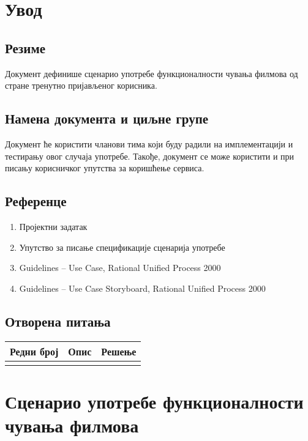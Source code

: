 \section{Увод}

\subsection{Резиме}

Документ дефинише сценарио употребе функционалности чувања филмова од стране тренутно пријављеног
корисника.

\subsection{Намена документа и циљне групе}

Документ ће користити чланови тима који буду радили на имплементацији и тестирању овог случаја
употребе. Такође, документ се може користити и при писању корисничког упутства за коришћење
сервиса.

\subsection{Референце}

\begin{enumerate}
    \item Пројектни задатак
    \item Упутство за писање спецификације сценарија употребе
    \item Guidelines – Use Case, Rational Unified Process 2000
    \item Guidelines – Use Case Storyboard, Rational Unified Process 2000
\end{enumerate}

\subsection{Отворена питања}

\noindent
\setcellgapes{4pt}
\makegapedcells
\begin{tabularx}{\linewidth}{|l|X|X|}
    \hline
    \textbf{Редни број} & \textbf{Опис} & \textbf{Решење} \\
    \hline
    & & \\
    \hline
\end{tabularx}

\section{Сценарио употребе функционалности чувања филмова}

